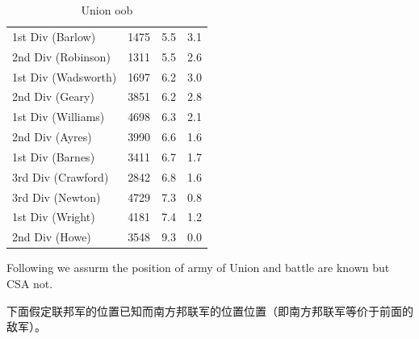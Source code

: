 \documentclass{article}
\begin{document}
\begin{table}
{\begin{tabular}{lrrr}
1st Div (Barlow)    &      1475 &  5.5 &  3.1 \\
2nd Div (Robinson)  &      1311 &  5.5 &  2.6 \\
1st Div (Wadsworth) &      1697 &  6.2 &  3.0 \\
2nd Div (Geary)     &      3851 &  6.2 &  2.8 \\
1st Div (Williams)  &      4698 &  6.3 &  2.1 \\
2nd Div (Ayres)     &      3990 &  6.6 &  1.6 \\
1st Div (Barnes)    &      3411 &  6.7 &  1.7 \\
3rd Div (Crawford)  &      2842 &  6.8 &  1.6 \\
3rd Div (Newton)    &      4729 &  7.3 &  0.8 \\
1st Div (Wright)    &      4181 &  7.4 &  1.2 \\
2nd Div (Howe)      &      3548 &  9.3 &  0.0 \\
\bottomrule
\end{tabular}
\caption{Union oob}
\label{tab:Union}
}
\end{table}

Following we assurm the position of army of Union and battle are known but CSA not.

下面假定联邦军的位置已知而南方邦联军的位置位置（即南方邦联军等价于前面的敌军）。
\end{document}

